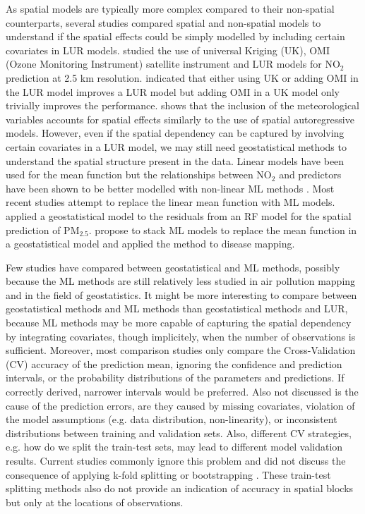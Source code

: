 \documentclass{article}
\begin{document}
As spatial models are typically more complex compared to their non-spatial counterparts, several studies compared spatial and non-spatial models to understand if the spatial effects could be simply modelled by including certain covariates in LUR models. \cite{young2016satellite} studied the use of universal Kriging (UK), OMI (Ozone Monitoring Instrument) satellite instrument \citep{OMI} and LUR models for NO$_2$ prediction at 2.5 km resolution. \cite{young2016satellite} indicated that either using UK or adding OMI in the LUR model improves a LUR model but adding OMI in a UK model only trivially improves the performance. \cite{BERTAZZON20159} shows that the inclusion of the meteorological variables accounts for spatial effects similarly to the use of spatial autoregressive models\citep{anselin2001spatial}. However, even if the spatial dependency can be captured by involving certain covariates in a LUR model, we may still need geostatistical methods to understand the spatial structure present in the data. Linear models have been used for the mean function but the relationships between NO$_2$ and predictors have been shown to be better modelled with non-linear ML methods \citep{luglobal}. Most recent studies attempt to replace the linear mean function with ML models. \cite{liu2020integrate} applied a geostatistical model to the residuals from an RF model for the spatial prediction of PM$_{2.5}$. \cite{stackinla} propose to stack ML models to replace the mean function in a geostatistical model and applied the method to disease mapping. 

Few studies have compared between geostatistical and ML methods, possibly because the ML methods are still relatively less studied in air pollution mapping and in the field of geostatistics. It might be more interesting to compare between geostatistical methods and ML methods than geostatistical methods and LUR, because ML methods may be more capable of capturing the spatial dependency by integrating covariates, though implicitely, when the number of observations is sufficient. Moreover, most comparison studies only compare the Cross-Validation (CV) accuracy of the prediction mean, ignoring the confidence and prediction intervals, or the probability distributions of the parameters and predictions. If correctly derived, narrower intervals would be preferred. Also not discussed is the cause of the prediction errors, are they caused by missing covariates, violation of the model assumptions (e.g. data distribution, non-linearity), or inconsistent distributions between training and validation sets. Also, different CV strategies, e.g. how do we split the train-test sets, may lead to different model validation results. Current studies commonly ignore this problem and did not discuss the consequence of applying k-fold splitting \citep{kerckhoffs2019performance,larkin2017global,REN2020105827} or bootstrapping \citep{luglobal}. These train-test splitting methods also do not provide an indication of accuracy in spatial blocks but only at the locations of observations.
 
\end{document}
